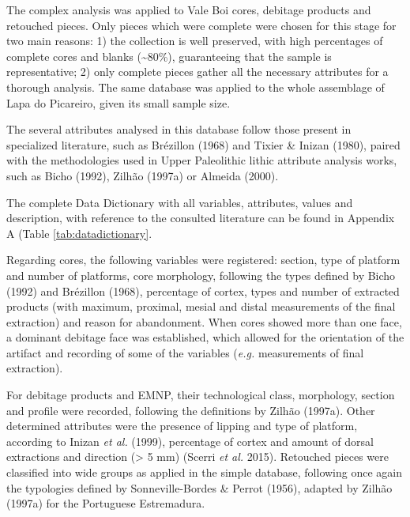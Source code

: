 \documentclass[12pt,twoside]{reedthesis}
\begin{document}
The complex analysis was applied to Vale Boi cores, debitage products and retouched pieces. Only pieces which were complete were chosen for this stage for two main reasons: 1) the collection is well preserved, with high percentages of complete cores and blanks (\textasciitilde80\%), guaranteeing that the sample is representative; 2) only complete pieces gather all the necessary attributes for a thorough analysis. The same database was applied to the whole assemblage of Lapa do Picareiro, given its small sample size.

The several attributes analysed in this database follow those present in specialized literature, such as Brézillon (1968) and Tixier \& Inizan (1980), paired with the methodologies used in Upper Paleolithic lithic attribute analysis works, such as Bicho (1992), Zilhão (1997a) or Almeida (2000).

The complete Data Dictionary with all variables, attributes, values and description, with reference to the consulted literature can be found in Appendix A (Table \ref{tab:datadictionary}.

Regarding cores, the following variables were registered: section, type of platform and number of platforms, core morphology, following the types defined by Bicho (1992) and Brézillon (1968), percentage of cortex, types and number of extracted products (with maximum, proximal, mesial and distal measurements of the final extraction) and reason for abandonment. When cores showed more than one face, a dominant debitage face was established, which allowed for the orientation of the artifact and recording of some of the variables (\emph{e.g.} measurements of final extraction).

For debitage products and EMNP, their technological class, morphology, section and profile were recorded, following the definitions by Zilhão (1997a). Other determined attributes were the presence of lipping and type of platform, according to Inizan \emph{et al.} (1999), percentage of cortex and amount of dorsal extractions and direction (\textgreater{} 5 mm) (Scerri \emph{et al.} 2015). Retouched pieces were classified into wide groups as applied in the simple database, following once again the typologies defined by Sonneville-Bordes \& Perrot (1956), adapted by Zilhão (1997a) for the Portuguese Estremadura.
\end{document}
